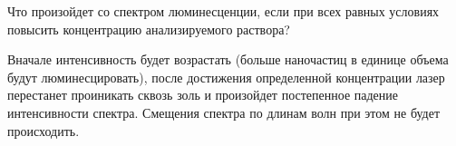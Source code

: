 
Что произойдет со спектром люминесценции, если при всех равных условиях повысить концентрацию анализируемого раствора?

\explanationSection

Вначале интенсивность будет возрастать (больше наночастиц в единице объема будут люминесцировать), после достижения определенной концентрации лазер перестанет проиникать сквозь золь и произойдет постепенное падение интенсивности спектра. Смещения спектра по длинам волн при этом не будет происходить.